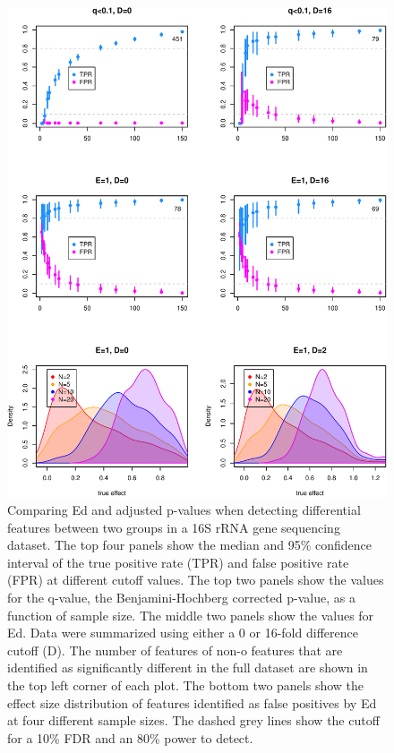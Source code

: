\documentclass[onecolumn]{article}
\begin{document}
\begin{figure}
\centering
\includegraphics{effect_supplement_files/figure-latex/R-Block-ty-fptp-1.pdf}
\caption{Comparing Ed and adjusted p-values when detecting differential
features between two groups in a 16S rRNA gene sequencing dataset. The
top four panels show the median and 95\% confidence interval of the true
positive rate (TPR) and false positive rate (FPR) at different cutoff
values. The top two panels show the values for the q-value, the
Benjamini-Hochberg corrected p-value, as a function of sample size. The
middle two panels show the values for Ed. Data were summarized using
either a 0 or 16-fold difference cutoff (D). The number of features of
non-o features that are identified as significantly different in the
full dataset are shown in the top left corner of each plot. The bottom
two panels show the effect size distribution of features identified as
false positives by Ed at four different sample sizes. The dashed grey
lines show the cutoff for a 10\% FDR and an 80\% power to detect.}
\end{figure}
\end{document}
